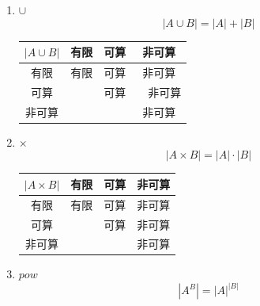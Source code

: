 \documentclass[english,dvipdfmx]{jsarticle}
\begin{document}
\begin{description}
\begin{enumerate}
                \item $\cup$
                    \begin{equation*}
                        | A \cup B | = | A | + | B | 
                    \end{equation*}
                    \begin{table}[H]
                        \begin{center}
                        \begin{tabular}{|c|c|c|c|} \hline
                            $|A \cup B| $& 有限 & 可算 & 非可算 \\ \hline
                            有限 & 有限 &  可算 & 非可算 \\ \hline
                            可算 &  & 可算 &　非可算 \\ \hline
                            非可算 & & & 非可算 \\ \hline
                        \end{tabular}
                    \end{center}
                    \end{table}
                \item $\times$
                    \begin{equation*}
                        | A \times B | = | A | \cdot | B | 
                    \end{equation*}
                    \begin{table}[H]
                        \begin{center}
                        \begin{tabular}{|c|c|c|c|} \hline
                            $|A \times B| $& 有限 & 可算 & 非可算 \\ \hline
                            有限 & 有限 & 可算 & 非可算 \\ \hline
                            可算 &  & 可算 & 非可算 \\ \hline
                            非可算 & & & 非可算 \\ \hline
                        \end{tabular}
                    \end{center}
                    \end{table}
                \item $pow$
                    \begin{equation*}
                        | A^B | = | A |^{| B |}
                    \end{equation*}

\end{enumerate}
\end{description}
\end{document}
